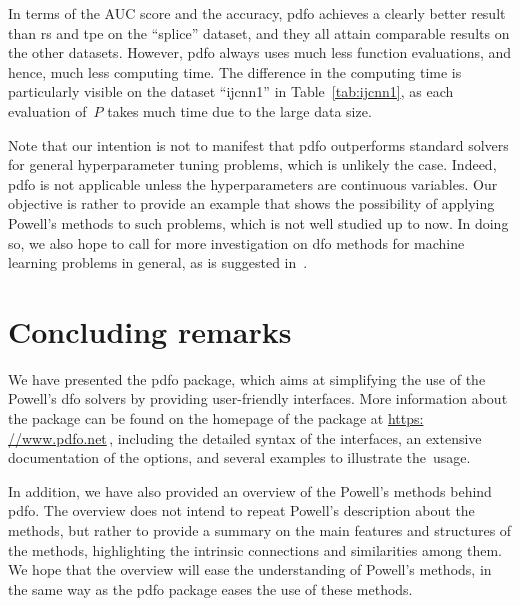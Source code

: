 \documentclass[
    smallextended,  %
    final,          %
]{svjour3}
\begin{document}
In terms of the AUC score and the accuracy, \gls{pdfo} achieves a clearly better result than \gls{rs}
and \gls{tpe} on the ``splice'' dataset, and they all attain comparable results on the other datasets.
However, \gls{pdfo} always uses much less function evaluations, and hence, much less computing time.
The difference in the computing time is particularly visible on the dataset ``ijcnn1'' in
Table~\ref{tab:ijcnn1}, as each evaluation of~$P$ takes much time due to the large data size.

Note that our intention is not to manifest that \gls{pdfo} outperforms standard solvers for
general hyperparameter tuning problems, which is unlikely the case. Indeed, \gls{pdfo} is not
applicable unless the hyperparameters are continuous variables.
Our objective is rather to provide an
example that shows the possibility of applying Powell's methods to such problems, which is not well studied up to now.
In doing so, we also hope to call for more investigation on \gls{dfo} methods for
machine learning problems in general, as is suggested in~\cite{Ghanbari_Scheinberg_2017}.




\section{Concluding remarks}
\label{sec:conclude}

We have presented the \gls{pdfo} package, which aims at simplifying the use of
the Powell's \gls{dfo} solvers by providing user-friendly interfaces.
More information about the package can be found on the homepage of the package at
\mbox{\url{https: //www.pdfo.net}}\,, including the detailed syntax of the interfaces,
an extensive documentation of the options, and several examples to illustrate the~usage.

In addition, we have also provided an overview of the Powell's methods behind \gls{pdfo}.
The overview does not intend to repeat Powell's description about the methods, but rather to provide a
summary on the main features and structures of the methods, highlighting the intrinsic connections and
similarities among them. We hope that the overview will ease the understanding of Powell's methods,
in the same way as the \gls{pdfo} package eases the use of these methods.
\end{document}
